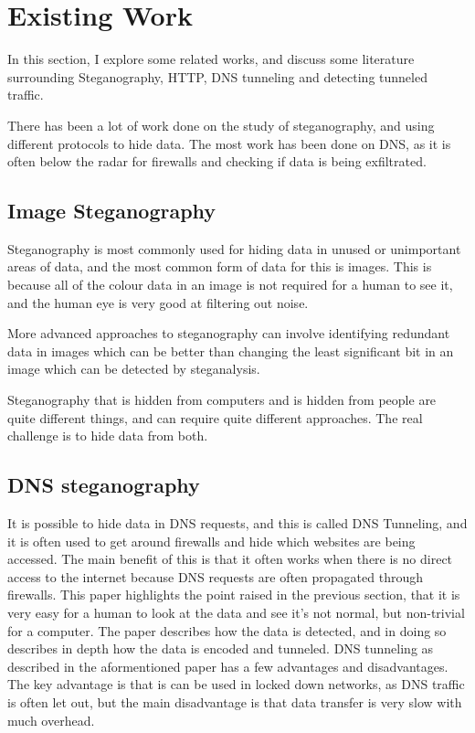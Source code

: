 \section{Existing Work}
In this section, I explore some related works, and discuss some literature surrounding Steganography, HTTP, DNS tunneling and detecting tunneled traffic.

There has been a lot of work done on the study of steganography, and using different protocols to hide data. The most work has been done on DNS, as it is often below the radar for firewalls and checking if data is being exfiltrated.
\subsection{Image Steganography}
Steganography is most commonly used for hiding data in unused or unimportant areas of data\cite{exploringsteno}, and the most common form of data for this is images. This is because all of the colour data in an image is not required for a human to see it, and the human eye is very good at filtering out noise\cite{exploringsteno}.

More advanced approaches to steganography can involve identifying redundant data in images\cite{introsteno} which can be better than changing the least significant bit in an image which can be detected by steganalysis\cite{introsteno}.

Steganography that is hidden from computers and is hidden from people are quite different things, and can require quite different approaches. The real challenge is to hide data from both\cite{introsteno}.

\subsection{DNS steganography}
It is possible to hide data in DNS requests, and this is called DNS Tunneling, and it is often used to get around firewalls and hide which websites are being accessed\cite{detectingdns}. The main benefit of this is that it often works when there is no direct access to the internet because DNS requests are often propagated through firewalls.
This paper highlights the point raised in the previous section, that it is very easy for a human to look at the data and see it's not normal, but non-trivial for a computer.
The paper describes how the data is detected, and in doing so describes in depth how the data is encoded and tunneled.
DNS tunneling as described in the aformentioned paper has a few advantages and disadvantages.
The key advantage is that is can be used in locked down networks, as DNS traffic is often let out, but the main disadvantage is that data transfer is very slow with much overhead.

